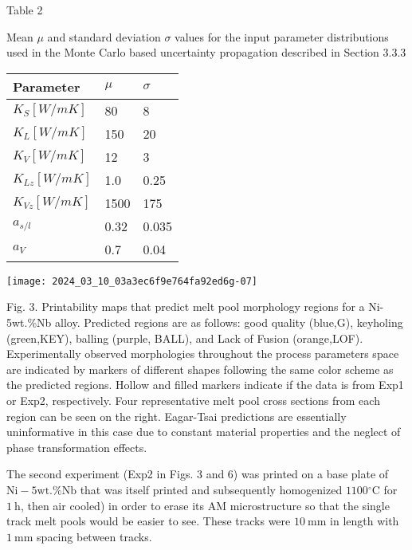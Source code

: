 \documentclass[10pt]{article}
\begin{document}
Table 2

Mean $\mu$ and standard deviation $\sigma$ values for the input parameter distributions used in the Monte Carlo based uncertainty propagation described in Section 3.3.3

\begin{center}
\begin{tabular}{lll}
\hline
Parameter & $\mu$ & $\sigma$ \\
\hline
$K_{S}[W / m K]$ & 80 & 8 \\
$K_{L}[W / m K]$ & 150 & 20 \\
$K_{V}[W / m K]$ & 12 & 3 \\
$K_{L z}[W / m K]$ & 1.0 & 0.25 \\
$K_{V z}[W / m K]$ & 1500 & 175 \\
$a_{s / l}$ & 0.32 & 0.035 \\
$a_{V}$ & 0.7 & 0.04 \\
\hline
\end{tabular}
\end{center}

\begin{center}
\texttt{[image: 2024\_03\_10\_03a3ec6f9e764fa92ed6g-07]}
\end{center}

Fig. 3. Printability maps that predict melt pool morphology regions for a Ni-5wt.\%Nb alloy. Predicted regions are as follows: good quality (blue,G), keyholing (green,KEY), balling (purple, BALL), and Lack of Fusion (orange,LOF). Experimentally observed morphologies throughout the process parameters space are indicated by markers of different shapes following the same color scheme as the predicted regions. Hollow and filled markers indicate if the data is from Exp1 or Exp2, respectively. Four representative melt pool cross sections from each region can be seen on the right. Eagar-Tsai predictions are essentially uninformative in this case due to constant material properties and the neglect of phase transformation effects.

The second experiment (Exp2 in Figs. 3 and 6) was printed on a base plate of $\mathrm{Ni}-5 \mathrm{wt} . \% \mathrm{Nb}$ that was itself printed and subsequently homogenized $1100{ }^{\circ} \mathrm{C}$ for $1 \mathrm{~h}$, then air cooled) in order to erase its AM microstructure so that the single track melt pools would be easier to see. These tracks were $10 \mathrm{~mm}$ in length with $1 \mathrm{~mm}$ spacing between tracks.
\end{document}
